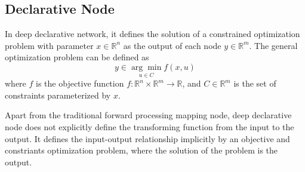 \subsection{Declarative Node}
In deep declarative network, it defines the solution of a constrained optimization problem with parameter $x \in \mathbb{R}^n$ as the output of each node $y \in \mathbb{R}^m$. The general optimization problem can be defined as 
\begin{equation}
    \label{equ:ddn-basic}
    y \in \underset{u \in C}{\arg \min } f(x, u)
\end{equation}
where $f$ is the objective function $f: \mathbb{R}^n \times \mathbb{R}^m \rightarrow \mathbb{R}$, and $C \in \mathbb{R}^m$ is the set of constraints parameterized by $x$. 
\par Apart from the traditional forward processing mapping node, deep declarative node does not explicitly define the transforming function from the input to the output. It defines the input-output relationship implicitly by an objective and constriants optimization problem, where the solution of the problem is the output. 
